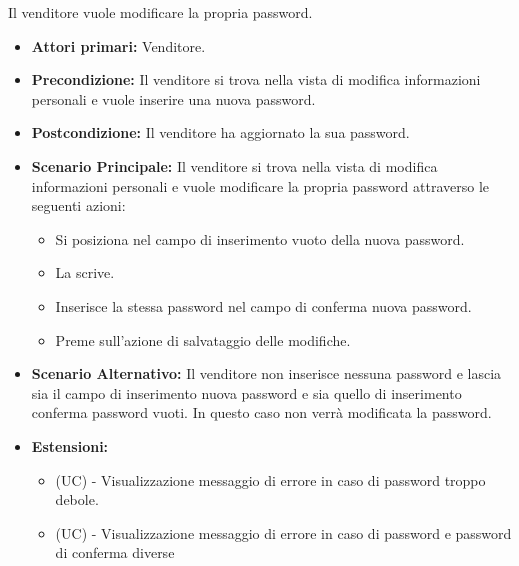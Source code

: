 Il venditore vuole modificare la propria password.
\begin{itemize}
    \item \textbf{Attori primari:} Venditore.
    \item \textbf{Precondizione:} Il venditore si trova nella vista di modifica informazioni personali e vuole inserire una nuova password.
    \item \textbf{Postcondizione:} Il venditore ha aggiornato la sua password.
    \item \textbf{Scenario Principale:} Il venditore si trova nella vista di modifica informazioni personali e vuole modificare la propria password attraverso le seguenti azioni:
        \begin{itemize}
            \item Si posiziona nel campo di inserimento vuoto della nuova password.
            \item La scrive.
            \item Inserisce la stessa password nel campo di conferma nuova password.
            \item Preme sull'azione di salvataggio delle modifiche.
        \end{itemize}
    \item \textbf{Scenario Alternativo:} Il venditore non inserisce nessuna password e lascia sia il campo di inserimento nuova password e sia quello di inserimento conferma password vuoti. In questo caso non verrà modificata la password.
    \item \textbf{Estensioni:}
    \begin{itemize}
        \item (UC) - Visualizzazione messaggio di errore in caso di password troppo debole.
        \item (UC) - Visualizzazione messaggio di errore in caso di password e password di conferma diverse
    \end{itemize}
\end{itemize}

